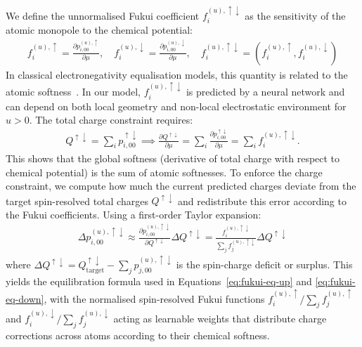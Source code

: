 \documentclass[aps,%
superscriptaddress,
 amsmath,amssymb,
floatfix,
twocolumn
]{revtex4-2}
\begin{document}
We define the unnormalised Fukui coefficient $f_i^{(u), \uparrow \downarrow}$ as the sensitivity of the atomic monopole to the chemical potential:
\begin{align}
    f_i^{(u),\uparrow } = \frac{\partial p_{i,00}^{(u),\uparrow}}{\partial \mu}, \quad   f_i^{(u),\downarrow} = \frac{\partial p_{i,00}^{(u), \downarrow}}{\partial \mu}, \quad f_i^{(u),\uparrow \downarrow} = (f_i^{(u),\uparrow } , f_i^{(u),\downarrow })
\end{align}
In classical electronegativity equalisation models, this quantity is related to the atomic softness~\cite{mortier1986electronegativity,rappe1991charge}. In our model, $f_i^{(u), \uparrow \downarrow}$ is predicted by a neural network and can depend on both local geometry and non-local electrostatic environment for $u>0$. The total charge constraint requires:
\begin{align}
    Q^{\uparrow \downarrow} = \sum_{i} p_{i,00}^{\uparrow \downarrow} \implies \frac{\partial Q^{\uparrow \downarrow}}{\partial \mu} = \sum_i \frac{\partial p_{i,00}^{\uparrow \downarrow}}{\partial \mu} = \sum_i f_i^{(u), \uparrow \downarrow} .
\end{align}
This shows that the global softness (derivative of total charge with respect to chemical potential) is the sum of atomic softnesses. To enforce the charge constraint, we compute how much the current predicted charges deviate from the target spin-resolved total charges $Q^{\uparrow \downarrow}$ and redistribute this error according to the Fukui coefficients. Using a first-order Taylor expansion:
\begin{align}
    \Delta p_{i,00}^{(u), \uparrow \downarrow} \approx \frac{\partial  p_{i,00}^{(u), \uparrow \downarrow}}{\partial Q^{\uparrow \downarrow}} \Delta Q^{\uparrow \downarrow} = \frac{f_i^{(u), \uparrow \downarrow}}{\sum_j f_j^{(u), \uparrow \downarrow}} \Delta Q^{\uparrow \downarrow}
\end{align}
where $\Delta Q^{\uparrow \downarrow} = Q_{\text{target}}^{\uparrow \downarrow} - \sum_j p_{j,00}^{(u), \uparrow \downarrow}$ is the spin-charge deficit or surplus. This yields the equilibration formula used in Equations~\ref{eq:fukui-eq-up} and \ref{eq:fukui-eq-down}, with the normalised spin-resolved Fukui functions $f_i^{(u),\uparrow}/\sum_j f_j^{(u),\uparrow}$ and $f_i^{(u),\downarrow}/\sum_j f_j^{(u),\downarrow}$ acting as learnable weights that distribute charge corrections across atoms according to their chemical softness. 
\end{document}
